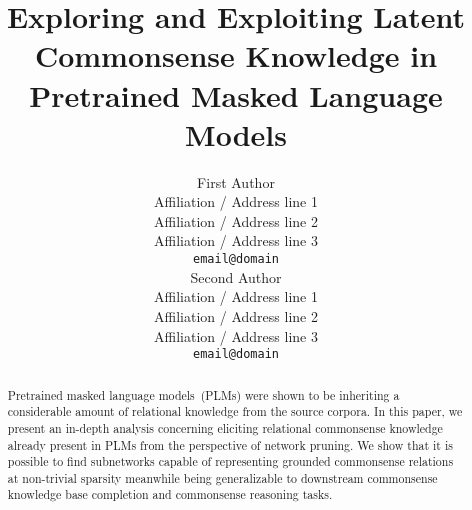 \documentclass[11pt]{article}
\title{Exploring and Exploiting Latent Commonsense Knowledge in Pretrained Masked Language Models}
\author{First Author \\
  Affiliation / Address line 1 \\
  Affiliation / Address line 2 \\
  Affiliation / Address line 3 \\
  \texttt{email@domain} \\\And
  Second Author \\
  Affiliation / Address line 1 \\
  Affiliation / Address line 2 \\
  Affiliation / Address line 3 \\
  \texttt{email@domain} \\}
\date{}
\begin{document}
\maketitle
\begin{abstract}
Pretrained masked language models~(PLMs) 
were shown to be inheriting a considerable amount of relational knowledge 
from the source corpora. In this paper, we present an in-depth analysis concerning eliciting relational commonsense knowledge already present in PLMs from the perspective of network pruning. We show that it is possible to find subnetworks capable of representing grounded commonsense relations at non-trivial sparsity meanwhile being generalizable to downstream commonsense knowledge base completion and commonsense reasoning tasks. 
\end{abstract}









\end{document}
